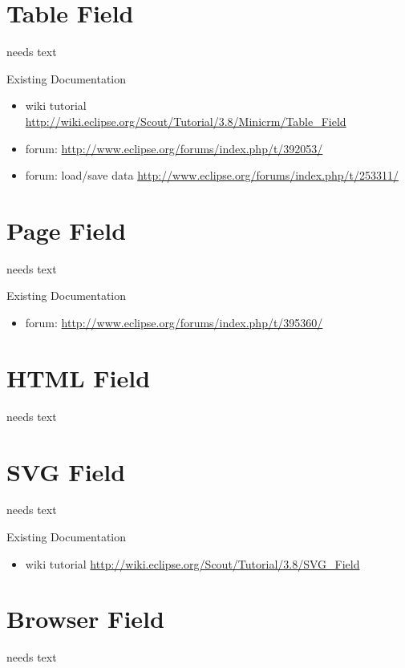 \documentclass[a4paper,10pt,twoside]{book}
\begin{document}
\section{Table Field}
needs text

\noindent Existing Documentation
\begin{itemize}
  \item wiki tutorial \url{http://wiki.eclipse.org/Scout/Tutorial/3.8/Minicrm/Table_Field}
  \item forum: \url{http://www.eclipse.org/forums/index.php/t/392053/}
  \item forum: load/save data \url{http://www.eclipse.org/forums/index.php/t/253311/}
\end{itemize}

\section{Page Field}
needs text

\noindent Existing Documentation
\begin{itemize}
  \item forum: \url{http://www.eclipse.org/forums/index.php/t/395360/}
\end{itemize}

\section{HTML Field}
needs text

\section{SVG Field}
needs text

\noindent Existing Documentation
\begin{itemize}
  \item wiki tutorial \url{http://wiki.eclipse.org/Scout/Tutorial/3.8/SVG_Field}
\end{itemize}

\section{Browser Field}
needs text
\end{document}
